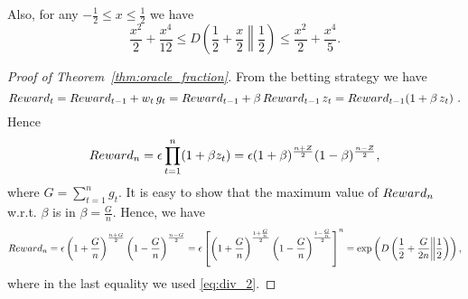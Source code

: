 Also, for any $-\frac{1}{2} \leq x\leq \frac{1}{2}$ we have
\[
\frac{x^2}{2} +\frac{x^4}{12}\leq D\left(\frac{1}{2}+\frac{x}{2}\middle\|\frac{1}{2}\right) \leq \frac{x^2}{2} + \frac{x^4}{5}.
\]

\begin{proof}[Proof of Theorem~\ref{thm:oracle_fraction}]
From the betting strategy we have
\[
Reward_t=Reward_{t-1} + w_t \, g_t = Reward_{t-1} + \beta \, Reward_{t-1} \, z_t = Reward_{t-1} (1+\beta \, z_t)~.
\]
Hence
\[
Reward_n=\epsilon \prod_{t=1}^n (1+\beta z_t) = \epsilon (1+\beta)^\frac{n+Z}{2} (1-\beta)^\frac{n-Z}{2},
\]
where $G=\sum_{t=1}^n g_t$.
It is easy to show that the maximum value of $Reward_n$ w.r.t. $\beta$ is in $\beta=\frac{G}{n}$. 
Hence, we have
\[
Reward_n = \epsilon \left(1+\frac{G}{n}\right)^\frac{n+G}{2} \left(1-\frac{G}{n}\right)^\frac{n-G}{2} 
= \epsilon \left[\left(1+\frac{G}{n}\right)^\frac{1+\frac{G}{n}}{2} \left(1-\frac{G}{n}\right)^\frac{1-\frac{G}{n}}{2}\right]^n = \exp\left( D\left(\frac{1}{2}+\frac{G}{2n}\middle\|\frac{1}{2}\right) \right),
\]
where in the last equality we used \eqref{eq:div_2}.
\end{proof}

